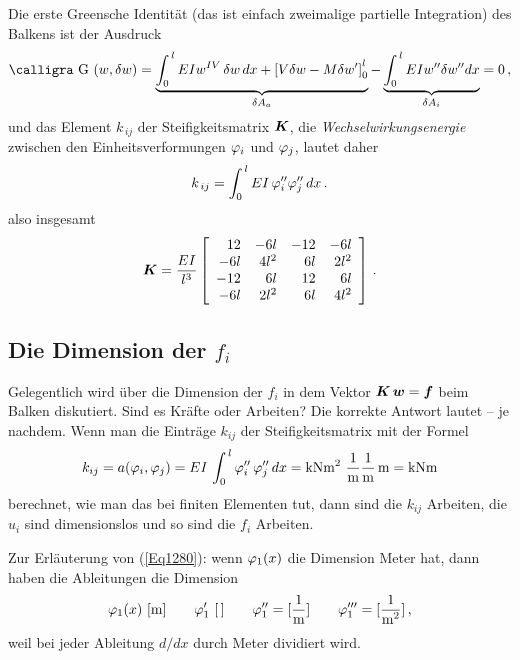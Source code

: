Die erste Greensche Identit\"{a}t (das ist einfach zweimalige partielle Integration) des Balkens ist der Ausdruck
\begin{align}
 \text{\normalfont\calligra G\,\,}(w,\delta w) =
\underbrace{\int_0^{\,l} EI w^{IV} \,\delta w\,dx + \left [V \delta w - M \delta w' \right
]_0^l}_{\delta A_a} - \underbrace{ \int_0^{\,l} EI
w'' \delta w'' dx}_{\delta A_i} = 0\,,
\end{align}
und das Element $k_{\,ij}$ der Steifigkeitsmatrix $\mbox{\boldmath $K$}$,  die {\em
Wechselwirkungsenergie} zwischen den Einheitsverformungen $\varphi_i$ und $\varphi_j$, lautet daher
\begin{align}
 k_{\,ij} = \int_0^{\,l} EI\, \varphi_i'' \varphi_j''\, dx \,.
\end{align}
also insgesamt
\begin{align}\label{K1}
\mbox{\boldmath $K$} = \frac{EI}{l^3} \left[
\begin{array}{r r r r}
 12 & -6l & -12 &-6l \\
 -6l & 4l^2 & 6l &2l^2 \\
 -12 & 6l & 12 & 6l \\
 -6l &2l^2 &6l &4l^2
 \end{array}
  \right]\,.
\end{align}

\textcolor{chapterTitleBlue}{\subsection{Die Dimension der $f_i$}}\label{Dimensionsbetrachtung}
Gelegentlich wird \"{u}ber die Dimension der $f_i$ in dem Vektor $\mbox{\boldmath $K$}\,\mbox{\boldmath $w$} = \mbox{\boldmath $f$}$ beim Balken diskutiert. Sind es Kr\"{a}fte oder Arbeiten? Die korrekte Antwort lautet -- je nachdem. Wenn man die Eintr\"{a}ge $k_{ij}$ der Steifigkeitsmatrix mit der Formel
\begin{align}\label{Eq1280}
k_{ij } = a(\varphi_i,\varphi_j) = EI\,\int_0^{\,l} \varphi_i''\,\varphi_j''\,dx = \text{kNm$^2$ } \frac{1}{\text{m}}\frac{1}{\text{m}}\,\text{m} = \text{kNm}
\end{align}
berechnet, wie man das bei finiten Elementen tut, dann sind die $k_{ij}$ Arbeiten, die $u_i$ sind dimensionslos und so sind die $f_i$ Arbeiten.

Zur Erl\"{a}uterung von (\ref{Eq1280}): wenn $\varphi_1(x)$ die Dimension Meter hat, dann haben die Ableitungen die Dimension
\begin{align}
\varphi_1(x) \,\,\text{[m]} \qquad \varphi_1'\,\,[\,] \qquad\varphi_1'' = [\frac{1}{\text{m}}] \qquad\varphi_1''' = [\frac{1}{\text{m$^2$}}]\,,
\end{align}
weil bei jeder Ableitung $d/dx$ durch Meter dividiert wird.

